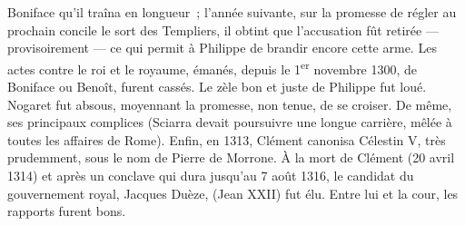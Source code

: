 \documentclass[french,twoside]{book} %
\begin{document}
\label{p53} Boniface qu’il traîna en longueur ; l’année suivante, sur la promesse de régler au prochain concile le sort des Templiers, il obtint que l’accusation fût retirée — provisoirement — ce qui permit à Philippe de brandir encore cette arme. Les actes contre le roi et le royaume, émanés, depuis le 1\textsuperscript{er} novembre 1300, de Boniface ou Benoît, furent cassés. Le zèle bon et juste de Philippe fut loué. Nogaret fut absous, moyennant la promesse, non tenue, de se croiser. De même, ses principaux complices (Sciarra devait poursuivre une longue carrière, mêlée à toutes les affaires de Rome). Enfin, en 1313, Clément canonisa Célestin V, très prudemment, sous le nom de Pierre de Morrone. À la mort de Clément (20 avril 1314) et après un conclave qui dura jusqu’au 7 août 1316, le candidat du gouvernement royal, Jacques Duèze, (Jean XXII) fut élu. Entre lui et la cour, les rapports furent bons.
\end{document}
